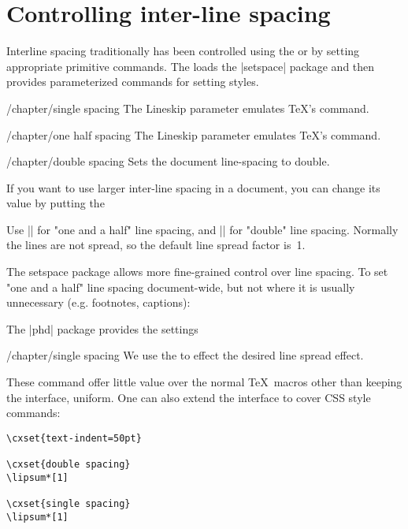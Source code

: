 \section{Controlling inter-line spacing}
Interline spacing traditionally has been controlled using the  or by setting appropriate primitive \tex commands. The  loads the |setspace| package and then provides parameterized commands for setting styles. 

\begin{key}{/chapter/single spacing} 
	The Lineskip parameter emulates \TeX's \cmd{\parindent} command.
\end{key}
\begin{key}{/chapter/one half spacing} 
	The Lineskip parameter emulates \TeX's \cmd{\parindent} command.
\end{key}
\begin{key}{/chapter/double spacing} 
	Sets the document line-spacing to double.
\end{key}

If you want to use larger inter-line spacing in a document, you can change its value by putting the

\CMDI{\linespread} Use |\linespread{1.3}| for "one and a half" line spacing, and |\linespread{1.6}| for "double" line spacing. Normally the lines are not spread, so the default line spread factor is~1.

The setspace package allows more fine-grained control over line spacing. To set "one and a half" line spacing document-wide, but not where it is usually unnecessary (e.g. footnotes, captions):

\begin{teXXX}
\usepackage{setspace}
\onehalfspacing
\end{teXXX}

The |phd| package provides the settings

\begin{key}{/chapter/single spacing}
We use the  to effect the desired line spread effect.
\end{key}


These command offer little value over the normal \TeX\ macros other than keeping the interface, uniform. One can also extend the interface to cover CSS style commands:

\begin{verbatim}
\cxset{text-indent=50pt}

\cxset{double spacing}
\lipsum*[1]

\cxset{single spacing}
\lipsum*[1]
\end{verbatim}



